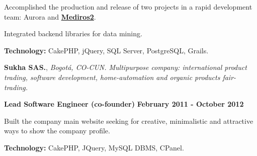     \begin{innerlist}
\item Accomplished the production and release of
two projects in a rapid development team: Aurora and
\href{http://demo.100grados.co:8080/desempeno100/}{\textbf{Mediros2}}.
\item Integrated backend libraries for data mining.
\item \textbf{Technology:} CakePHP, jQuery, SQL Server, PostgreSQL, Grails.
    \end{innerlist}

\quarterblankline

\textbf{Sukha SAS.}, \textit{Bogot\'a, CO-CUN.
Multipurpose company:
international product trading, software development, home-automation and organic
products fair-trading.}

\begin{outerlist}
\item[\FA \faAngleDoubleRight] \textbf{Lead Software Engineer (co-founder)}
\hfill \textbf{February 2011 - October 2012}
\end{outerlist}

    \begin{innerlist}
\item Built the company main website seeking for creative,
minimalistic and attractive ways to show the company profile.
\item \textbf{Technology:} CakePHP, JQuery, MySQL DBMS, CPanel.
    \end{innerlist}





%

% 

